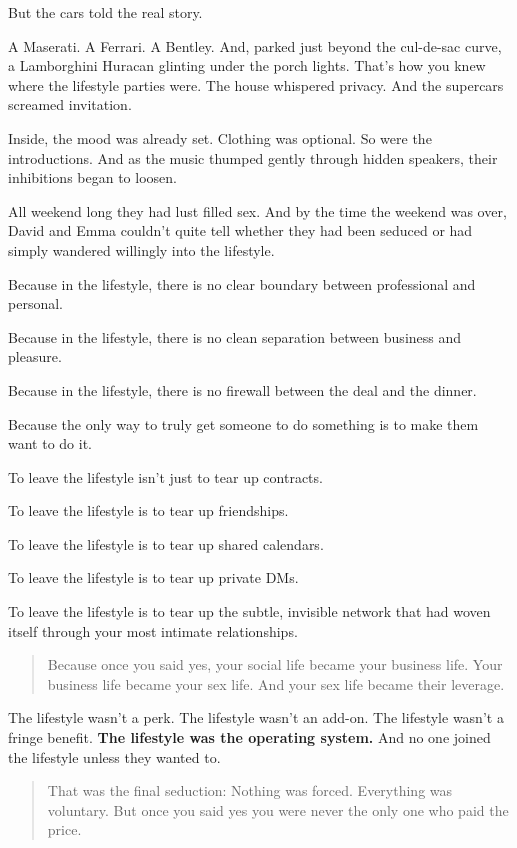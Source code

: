 But the cars told the real story.

A Maserati. A Ferrari. A Bentley. And, parked just beyond the cul-de-sac curve, a Lamborghini Huracan glinting 
under the porch lights.
That’s how you knew where the lifestyle parties were. The house whispered privacy. And the supercars screamed 
invitation.

Inside, the mood was already set. Clothing was optional. So were the introductions.
And as the music thumped gently through hidden speakers, their inhibitions began to loosen.

All weekend long they had lust filled sex. And by the time the weekend was over, David and 
Emma couldn’t quite tell whether they had been seduced or had simply wandered willingly into the lifestyle.

Because in the lifestyle, there is no clear boundary between professional and personal.  

Because in the lifestyle, there is no clean separation between business and pleasure.  

Because in the lifestyle, there is no firewall between the deal and the dinner.

Because the only way to truly get someone to do something is to make them want to do it.

To leave the lifestyle isn’t just to tear up contracts.

To leave the lifestyle is to tear up friendships.  

To leave the lifestyle is to tear up shared calendars.  

To leave the lifestyle is to tear up private DMs.  

To leave the lifestyle is to tear up the subtle, invisible network that had woven itself through your 
most intimate relationships.

\begin{quote}
Because once you said yes,  
your social life became your business life.  
Your business life became your sex life.  
And your sex life became their leverage.
\end{quote}

The lifestyle wasn’t a perk.
The lifestyle wasn’t an add-on.
The lifestyle wasn’t a fringe benefit.
\textbf{The lifestyle was the operating system.}
And no one joined the lifestyle unless they wanted to.

\begin{quote}
That was the final seduction:  
Nothing was forced.  
Everything was voluntary.  
But once you said yes  
you were never the only one who paid the price.
\end{quote}


